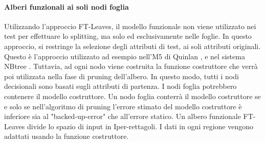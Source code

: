 \paragraph{Alberi funzionali ai soli nodi foglia}
Utilizzando l'approccio FT-Leaves, il modello funzionale non viene utilizzato nei test per effettuare lo splitting, ma solo ed esclusivamente nelle foglie. In questo approccio, si restringe la selezione degli attributi di test, ai soli attributi originali.
Questo è l'approccio utilizzato ad esempio nell'M5 di Quinlan \cite{Quinlan93combininginstance-based}, e nel sistema NBtree \cite{Kohavi1996}. 
Tuttavia, ad ogni nodo viene costruita la funzione costruttore che verrà poi utilizzata nella fase di pruning dell'albero. In questo modo, tutti i nodi decisionali sono basati sugli attributi di partenza. I nodi foglia potrebbero contenere il modello costruttore. Un nodo foglia conterrà il modello costruttore se e solo se nell'algoritmo di pruning l'errore stimato del modello costruttore è inferiore sia al "backed-up-error" che all'errore statico. Un albero funzionale FT-Leaves divide lo spazio di input in Iper-rettagoli. I dati in ogni regione vengono adattati usando la funzione costruttore.

